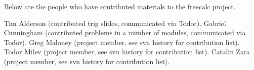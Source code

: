 Below are the people who have contributed materials to the freecalc project.

Tim Alderson (contributed trig slides, communicated via Todor).
Gabriel Cunningham (contributed problems in a number of modules, communicated via Todor).
Greg Maloney (project member, see svn history for contribution list).
Todor Milev (project member, see svn history for contribution list).
Catalin Zara (project member, see svn history for contribution list).
